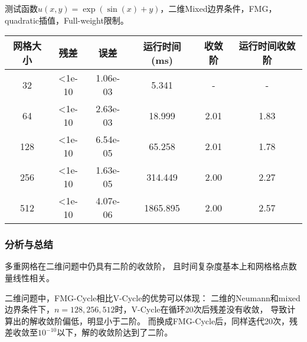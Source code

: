 \documentclass[lang=cn,a4paper,newtx,bibend=bibtex]{elegantpaper}
\begin{document}
测试函数$u(x,y)=\exp(\sin(x)+y)$，二维Mixed边界条件，FMG，quadratic插值，Full-weight限制。

\begin{longtable}{|c|ccccc|} \hline
网格大小 & 残差 & 误差 & 运行时间(ms) & 收敛阶 & 运行时间收敛阶 \\ \hline
32 	& <1e-10	& 1.06e-03	& 5.341  & - & - \\ \hline
64 	& <1e-10	& 2.63e-03	& 18.999  & 2.01 & 1.83  \\ \hline
128	& <1e-10	& 6.54e-05	& 65.258 & 2.01 & 1.78  \\ \hline
256	& <1e-10	& 1.63e-05	& 314.449 & 2.00 & 2.27  \\ \hline
512	& <1e-10	& 4.07e-06	& 1865.895 & 2.00 & 2.57  \\ \hline
\end{longtable}

\subsubsection{分析与总结}

多重网格在二维问题中仍具有二阶的收敛阶，
且时间复杂度基本上和网格格点数量线性相关。

二维问题中，FMG-Cycle相比V-Cycle的优势可以体现：
二维的Neumann和mixed边界条件下，$n=128,256,512$时，V-Cycle在循环20次后残差没有收敛，
导致计算出的解收敛阶偏低，明显小于二阶。
而换成FMG-Cycle后，同样迭代20次，残差收敛至$10^{-10}$以下，解的收敛阶达到了二阶。

\nocite{*}
\printbibliography[heading=bibintoc, title=\ebibname]
\end{document}
